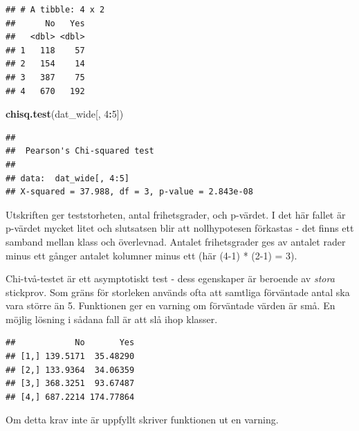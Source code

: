 \documentclass[
]{book}
\newenvironment{Shaded}{\begin{snugshade}}{\end{snugshade}}
\newcommand{\CommentTok}[1]{\textcolor[rgb]{0.56,0.35,0.01}{\textit{#1}}}
\newcommand{\DecValTok}[1]{\textcolor[rgb]{0.00,0.00,0.81}{#1}}
\newcommand{\FunctionTok}[1]{\textcolor[rgb]{0.13,0.29,0.53}{\textbf{#1}}}
\newcommand{\NormalTok}[1]{#1}
\newcommand{\OtherTok}[1]{\textcolor[rgb]{0.56,0.35,0.01}{#1}}
\newcommand{\SpecialCharTok}[1]{\textcolor[rgb]{0.81,0.36,0.00}{\textbf{#1}}}
\theoremstyle{definition}
\theoremstyle{definition}
\theoremstyle{definition}
\theoremstyle{definition}
\theoremstyle{remark}
\begin{document}
\begin{verbatim}
## # A tibble: 4 x 2
##      No   Yes
##   <dbl> <dbl>
## 1   118    57
## 2   154    14
## 3   387    75
## 4   670   192
\end{verbatim}

\begin{Shaded}
\begin{Highlighting}[]
\FunctionTok{chisq.test}\NormalTok{(dat\_wide[, }\DecValTok{4}\SpecialCharTok{:}\DecValTok{5}\NormalTok{])}
\end{Highlighting}
\end{Shaded}

\begin{verbatim}
## 
##  Pearson's Chi-squared test
## 
## data:  dat_wide[, 4:5]
## X-squared = 37.988, df = 3, p-value = 2.843e-08
\end{verbatim}

Utskriften ger teststorheten, antal frihetsgrader, och p-värdet. I det här fallet är p-värdet mycket litet och slutsatsen blir att nollhypotesen förkastas - det finns ett samband mellan klass och överlevnad. Antalet frihetsgrader ges av antalet rader minus ett gånger antalet kolumner minus ett (här (4-1) * (2-1) = 3).

Chi-två-testet är ett asymptotiskt test - dess egenskaper är beroende av \emph{stora} stickprov. Som gräns för storleken används ofta att samtliga förväntade antal ska vara större än 5. Funktionen ger en varning om förväntade värden är små. En möjlig lösning i sådana fall är att slå ihop klasser.

\begin{Shaded}
\end{Shaded}

\begin{verbatim}
##            No       Yes
## [1,] 139.5171  35.48290
## [2,] 133.9364  34.06359
## [3,] 368.3251  93.67487
## [4,] 687.2214 174.77864
\end{verbatim}

Om detta krav inte är uppfyllt skriver funktionen ut en varning.
\end{document}
